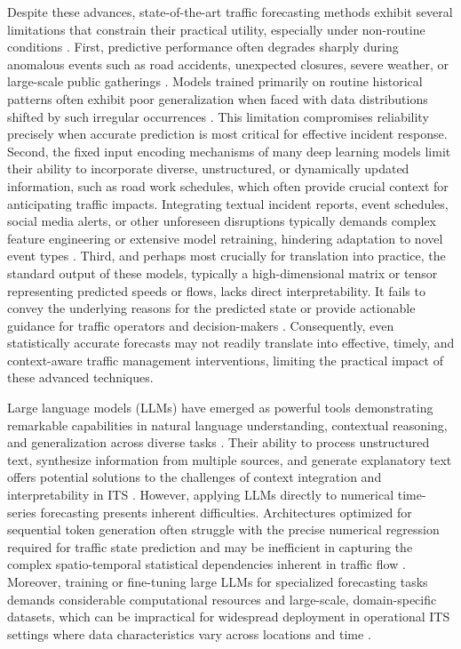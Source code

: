 \documentclass{article}
\begin{document}
Despite these advances, state-of-the-art traffic forecasting methods exhibit several limitations that constrain their practical utility, especially under non-routine conditions \cite{guo_towards_2024, williams_context_2024, liu_time-mmd_2024}. First, predictive performance often degrades sharply during anomalous events such as road accidents, unexpected closures, severe weather, or large-scale public gatherings \cite{li_language_2025, xue_promptcast_2023}. Models trained primarily on routine historical patterns often exhibit poor generalization when faced with data distributions shifted by such irregular occurrences \cite{arango_chronosx_2025, zeng_are_2022}. This limitation compromises reliability precisely when accurate prediction is most critical for effective incident response. Second, the fixed input encoding mechanisms of many deep learning models limit their ability to incorporate diverse, unstructured, or dynamically updated information, such as road work schedules, which often provide crucial context for anticipating traffic impacts. Integrating textual incident reports, event schedules, social media alerts, or other unforeseen disruptions typically demands complex feature engineering or extensive model retraining, hindering adaptation to novel event types \cite{tan_are_2024}. Third, and perhaps most crucially for translation into practice, the standard output of these models, typically a high-dimensional matrix or tensor representing predicted speeds or flows, lacks direct interpretability. It fails to convey the underlying reasons for the predicted state or provide actionable guidance for traffic operators and decision-makers \cite{yuan_diffusion-ts_2023}. Consequently, even statistically accurate forecasts may not readily translate into effective, timely, and context-aware traffic management interventions, limiting the practical impact of these advanced techniques.

Large language models (LLMs) have emerged as powerful tools demonstrating remarkable capabilities in natural language understanding, contextual reasoning, and generalization across diverse tasks \cite{su_large_2024}. Their ability to process unstructured text, synthesize information from multiple sources, and generate explanatory text offers potential solutions to the challenges of context integration and interpretability in ITS \cite{wang_where_2023, guo_towards_2024, feng_citygpt_2024}. However, applying LLMs directly to numerical time-series forecasting presents inherent difficulties. Architectures optimized for sequential token generation often struggle with the precise numerical regression required for traffic state prediction and may be inefficient in capturing the complex spatio-temporal statistical dependencies inherent in traffic flow \cite{tan_are_2024, liu_taming_2024}. Moreover, training or fine-tuning large LLMs for specialized forecasting tasks demands considerable computational resources and large-scale, domain-specific datasets, which can be impractical for widespread deployment in operational ITS settings where data characteristics vary across locations and time \cite{jin_time-llm_2023}.
\end{document}

